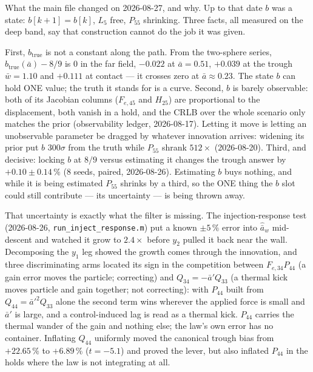 \documentclass[11pt,a4paper,fontset=none]{ctexart}
\newcommand{\ba}{\bar{a}}
\newcommand{\bw}{\bar{w}}
\begin{document}
What the main file changed on 2026-08-27, and why. Up to that date $b$ was a
state: $b[k+1] = b[k]$, $L_5$ free, $P_{55}$ shrinking. Three facts, all
measured on the deep band, say that construction cannot do the job it was
given.

First, $b_{\mathrm{true}}$ is not a constant along the path. From the
two-sphere series, $b_{\mathrm{true}}(\ba) - 8/9$ is $0$ in the far field,
$-0.022$ at $\ba = 0.51$, $+0.039$ at the trough $\bw = 1.10$ and $+0.111$ at
contact --- it crosses zero at $\ba \approx 0.23$. The state $b$ can hold ONE
value; the truth it stands for is a curve. Second, $b$ is barely observable:
both of its Jacobian columns ($F_{e,45}$ and $H_{25}$) are proportional to the
displacement, both vanish in a hold, and the CRLB over the whole scenario only
matches the prior (observability ledger, 2026-08-17). Letting it move is
letting an unobservable parameter be dragged by whatever innovation arrives:
widening its prior put $\hat{b}$ $300\sigma$ from the truth while $P_{55}$
shrank $512\times$ (2026-08-20). Third, and decisive: locking $b$ at $8/9$
versus estimating it changes the trough answer by $+0.10 \pm 0.14\,\%$
(8 seeds, paired, 2026-08-26). Estimating $b$ buys nothing, and while it is
being estimated $P_{55}$ shrinks by a third, so the ONE thing the $b$ slot could
still contribute --- its uncertainty --- is being thrown away.

That uncertainty is exactly what the filter is missing. The injection-response
test (2026-08-26, \texttt{run\_inject\_response.m}) put a known $\pm 5\,\%$
error into $\hat{\ba}_w$ mid-descent and watched it grow to $2.4\times$ before
$y_2$ pulled it back near the wall. Decomposing the $y_1$ leg showed the growth
comes through the innovation, and three discriminating arms located its sign in
the competition between $F_{e,34}P_{44}$ (a gain error moves the particle;
correcting) and $Q_{34} = -\ba' Q_{33}$ (a thermal kick moves particle and gain
together; not correcting): with $P_{44}$ built from $Q_{44} = \ba'^{2}Q_{33}$
alone the second term wins wherever the applied force is small and $\ba'$ is
large, and a control-induced lag is read as a thermal kick. $P_{44}$ carries
the thermal wander of the gain and nothing else; the law's own error has no
container. Inflating $Q_{44}$ uniformly moved the canonical trough bias from
$+22.65\,\%$ to $+6.89\,\%$ ($t = -5.1$) and proved the lever, but also
inflated $P_{44}$ in the holds where the law is not integrating at all.
\end{document}

